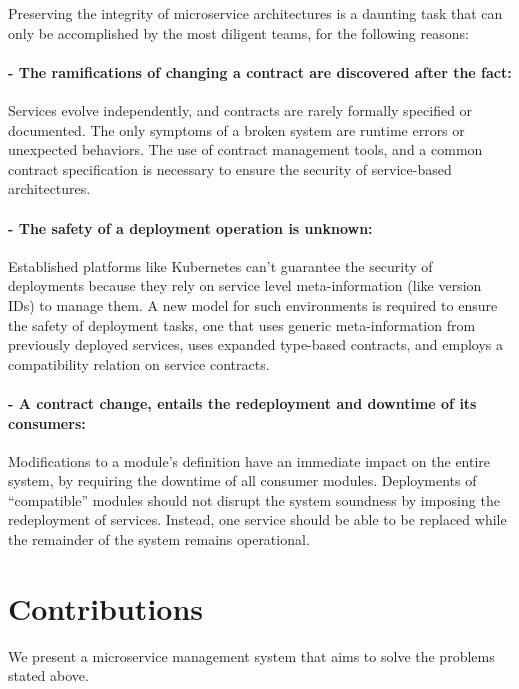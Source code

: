 Preserving the integrity of microservice architectures is a daunting task that can only be accomplished by the most diligent teams, for the following reasons:

\paragraph{- The ramifications of changing a contract are discovered after the fact:}
Services evolve independently, and contracts are rarely formally specified or documented.
The only symptoms of a broken system are runtime errors or unexpected behaviors.
The use of contract management tools, and a common contract specification is necessary to ensure the security of service-based architectures.

\paragraph{- The safety of a deployment operation is unknown:}
Established platforms like Kubernetes can't guarantee the security of deployments because they rely on service level meta-information (like version IDs) to manage them.
A new model for such environments is required to ensure the safety of deployment tasks, one that uses generic meta-information from previously deployed services,
uses expanded type-based contracts, and employs a compatibility relation on service contracts.

\paragraph{- A contract change, entails the redeployment and downtime of its consumers:}
Modifications to a module's definition have an immediate impact on the entire system, by requiring the downtime of all consumer modules.
Deployments of “compatible” modules should not disrupt the system soundness by imposing the redeployment of services.
Instead, one service should be able to be replaced while the remainder of the system remains operational.

\section{Contributions} %
\label{sec:contributions}

We present a microservice management system that aims to solve the problems stated above.

\paragraph{}

